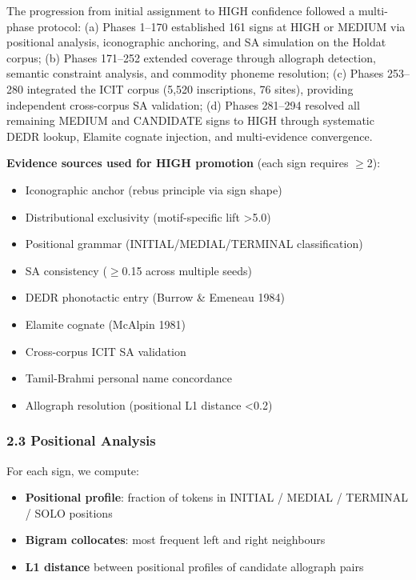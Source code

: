 \documentclass[
  11pt,
]{article}
\providecommand{\tightlist}{%
  \setlength{\itemsep}{0pt}\setlength{\parskip}{0pt}}
\begin{document}
The progression from initial assignment to HIGH confidence followed a
multi-phase protocol: (a) Phases 1--170 established 161 signs at HIGH or
MEDIUM via positional analysis, iconographic anchoring, and SA
simulation on the Holdat corpus; (b) Phases 171--252 extended coverage
through allograph detection, semantic constraint analysis, and commodity
phoneme resolution; (c) Phases 253--280 integrated the ICIT corpus
(5,520 inscriptions, 76 sites), providing independent cross-corpus SA
validation; (d) Phases 281--294 resolved all remaining MEDIUM and
CANDIDATE signs to HIGH through systematic DEDR lookup, Elamite cognate
injection, and multi-evidence convergence.

\textbf{Evidence sources used for HIGH promotion} (each sign requires
$\geq$2):

\begin{itemize}
\tightlist
\item
  Iconographic anchor (rebus principle via sign shape)
\item
  Distributional exclusivity (motif-specific lift \textgreater5.0)
\item
  Positional grammar (INITIAL/MEDIAL/TERMINAL classification)
\item
  SA consistency ($\geq$0.15 across multiple seeds)
\item
  DEDR phonotactic entry (Burrow \& Emeneau 1984)
\item
  Elamite cognate (McAlpin 1981)
\item
  Cross-corpus ICIT SA validation
\item
  Tamil-Brahmi personal name concordance
\item
  Allograph resolution (positional L1 distance \textless0.2)
\end{itemize}

\subsubsection{2.3 Positional Analysis}\label{positional-analysis}

For each sign, we compute:

\begin{itemize}
\tightlist
\item
  \textbf{Positional profile}: fraction of tokens in INITIAL / MEDIAL /
  TERMINAL / SOLO positions
\item
  \textbf{Bigram collocates}: most frequent left and right neighbours
\item
  \textbf{L1 distance} between positional profiles of candidate
  allograph pairs
\end{itemize}
\end{document}
